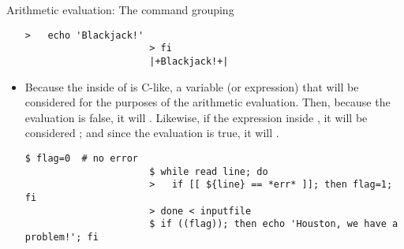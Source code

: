 \begin{frame}[fragile]{Arithmetic evaluation: The command grouping \PB{\texttt{((\ldots))}}}
\begin{overlayarea}{\textwidth}{0.7\textheight}
\begin{itemize}
\begin{lstlisting}[style=MyBash, aboveskip=2mm, belowskip=-6mm, firstnumber=11]
                      >   echo 'Blackjack!'
                      > fi
                      |+Blackjack!+|
                  \end{lstlisting}
            \item<only@2> Because the inside of \PB{\texttt{((\ldots))}} is C-like, a variable (or expression) that  will be considered  for the purposes of the arithmetic evaluation.
                  Then, because the evaluation is false, it will .
                  Likewise, if the expression inside \PB{\texttt{((\ldots))}} , it will be considered ; and since the evaluation is true, it will .
                  \begin{lstlisting}[style=MyBash, aboveskip=2mm, belowskip=-6mm, firstnumber=16]
                      $ flag=0  # no error
                      $ while read line; do
                      >   if [[ ${line} == *err* ]]; then flag=1; fi
                      > done < inputfile
                      $ if ((flag)); then echo 'Houston, we have a problem!'; fi
                  \end{lstlisting}
        \end{itemize}
    \end{overlayarea}
\end{frame}

